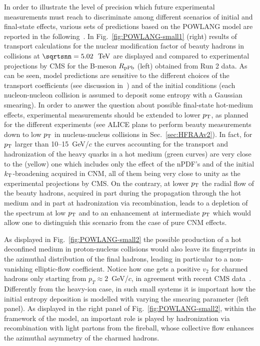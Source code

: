In order to illustrate the level of precision which future experimental measurements must reach to discriminate among different scenarios of initial and final-state effects, various sets of predictions based on the POWLANG model are reported in the following~\cite{Beraudo:2015wsd}.
In Fig.~\ref{fig:POWLANG-small1} (right) results of transport calculations for the nuclear modification factor of beauty hadrons in \pPb collisions at $\sqrtsnn=5.02~\UTeV$  are displayed and compared to experimental projections by CMS for the B-meson $R_{\rm pPb}$ (left) obtained from Run 2 data. As can be seen, model predictions are sensitive to the different choices of the transport coefficients (see discussion in~\cite{Beraudo:2015wsd}) and of the initial conditions (each nucleon-nucleon collision is assumed to deposit some entropy with a Gaussian smearing). In order to answer the question about possible final-state hot-medium effects, experimental measurements should be extended to lower $p\sb{\scriptstyle\mathrm{T}}$, as planned for the different experiments (see ALICE plans to perform beauty measurements down to low $p\sb{\scriptstyle\mathrm{T}}$ in nucleus-nucleus collisions in Sec.~\ref{sec:HFRAAv2}). In fact, for $p\sb{\scriptstyle\mathrm{T}}$ larger than 10--15~GeV/$c$ the curves accounting for the transport and hadronization of the heavy quarks in a hot medium (green curves) are very close to the (yellow) one which includes only the effect of the nPDF's and of the initial $k_{\rm T}$-broadening acquired in CNM, all of them being very close to unity as the experimental projections by CMS. On the contrary, at lower $p\sb{\scriptstyle\mathrm{T}}$ the radial flow of the beauty hadrons, acquired in part during the propagation through the hot medium and in part at hadronization via recombination, leads to a depletion of the spectrum at low $p\sb{\scriptstyle\mathrm{T}}$ and to an enhancement at intermediate $p\sb{\scriptstyle\mathrm{T}}$ which would allow one to distinguish this scenario from the case of pure CNM effects. 

As displayed in Fig.~\ref{fig:POWLANG-small2} the possible production of a hot deconfined medium in proton-nucleus collisions would also leave its fingerprints in the azimuthal distribution of the final hadrons, leading in particular to a non-vanishing elliptic-flow coefficient. Notice how one gets a positive $v_2$ for charmed hadrons only starting from $p_T\!\approx\!2$~GeV/$c$, in agreement with recent CMS data~\cite{Sirunyan:2018toe}. Differently from the heavy-ion case, in such small systems it is important how the initial entropy deposition is modelled with varying the smearing parameter (left panel). As displayed in the right panel of Fig.~\ref{fig:POWLANG-small2}, within the framework of the model, an important role is played by hadronization via recombination with light partons from the fireball, whose collective flow enhances the azimuthal asymmetry of the charmed hadrons.

